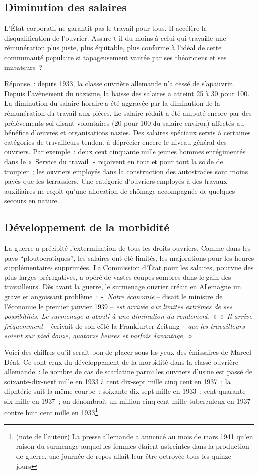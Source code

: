 \documentclass[french,twoside]{book} %
\begin{document}
\subsection[Diminution des salaires]{Diminution des salaires}
\noindent L’État corporatif ne garantit pas le travail pour tous. Il accélère la disqualification de l’ouvrier. Assure-t-il du moins à celui qui travaille une rémunération plus juste, plus équitable, plus conforme à l’idéal de cette communauté populaire si tapageusement vantée par ses théoriciens et ses imitateurs ?\par
Réponse : depuis 1933, la classe ouvrière allemande n’a cessé de s’apauvrir. Depuis l’avènement du nazisme, la baisse des salaires a atteint 25 à 30 pour 100. La diminution du salaire horaire a été aggravée par la diminution de la rémunération du travail aux pièces. Le salaire réduit a été amputé encore par des prélèvements soi-disant volontaires (20 pour 100 du salaire environ) affectés au bénéfice d’œuvres et organisations nazies. Des salaires spéciaux servis à certaines catégories de travailleurs tendent à déprécier encore le niveau général des ouvriers. Par exemple : deux cent cinquante mille jeunes hommes enrégimentés dans le « Service du travail » reçoivent en tout et pour tout la solde de troupier ; les ouvriers employés dans la construction des autostrades sont moins payés que les terrassiers. Une catégorie d’ouvriers employés à des travaux auxiliaires ne reçoit qu’une allocation de chômage accompagnée de quelques secours en nature.
\subsection[Développement de la morbidité]{Développement de la morbidité}
\noindent La guerre a précipité l’extermination de tous les droits ouvriers. Comme dans les pays “ploutocratiques”, les salaires ont été limités, les majorations pour les heures supplémentaires supprimées. La Commission d’État pour les salaires, pourvue des plus larges prérogatives, a opéré de vastes coupes sombres dans le gain des travailleurs. Dès avant la guerre, le surmenage ouvrier créait en Allemagne un grave et angoissant problème : « \emph{Notre économie} – disait le ministre de l’économie le premier janvier 1939 – \emph{est arrivée aux limites extrêmes de ses possibilités. Le surmenage a abouti à une diminution du rendement.} » « \emph{Il arrive fréquemment} – écrivait de son côté la Frankfurter Zeitung – \emph{que les travailleurs soient sur pied douze, quatorze heures et parfois davantage.} »\par
Voici des chiffres qu’il serait bon de placer sous les yeux des émissaires de Marcel Déat. Ce sont ceux du développement de la morbidité dans la classe ouvrière allemande : le nombre de cas de scarlatine parmi les ouvriers d’usine est passé de soixante-dix-neuf mille en 1933 à cent dix-sept mille cinq cent en 1937 ; la diphtérie suit la même courbe : soixante-dix-sept mille en 1933 ; cent quarante-six mille en 1937 ; on dénombrait un million cinq cent mille tuberculeux en 1937 contre huit cent mille en 1933\footnote{(note de l’auteur) La presse allemande a annoncé au mois de mars 1941 qu’en raison du surmenage auquel les femmes étaient astreintes dans la production de guerre, une journée de repos allait leur être octroyée tous les quinze jours}.
\end{document}
